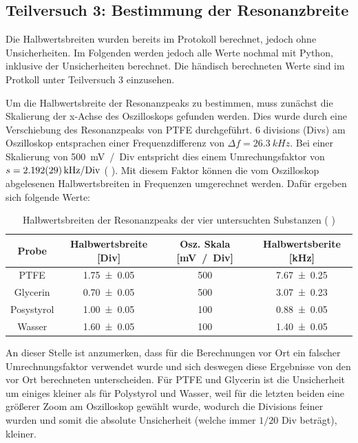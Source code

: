 \documentclass{article}
\newcommand{\coderef}[1]{%
    \text{\footnotesize \colorbox{codebg}{\texttt{#1()}}}%
}
\begin{document}
\newpage

\subsection{Teilversuch 3: Bestimmung der Resonanzbreite}

Die Halbwertsbreiten wurden bereits im Protokoll berechnet, jedoch ohne Unsicherheiten. 
Im Folgenden werden jedoch alle Werte nochmal mit Python, inklusive der Unsicherheiten
berechnet. Die händisch berechneten Werte sind im Protkoll
unter Teilversuch 3 einzusehen.

Um die Halbwertsbreite der Resonanzpeaks zu bestimmen, muss zunächst
die Skalierung der x-Achse des Oszilloskops gefunden werden.
Dies wurde durch eine Verschiebung des Resonanzpeaks von PTFE durchgeführt.
6 divisions (Divs) am Oszilloskop entsprachen einer Frequenzdifferenz
von $\Delta f = \qty{26.3}{kHz}$. Bei einer Skalierung von \qty{500}{mV / Div}
entspricht dies einem Umrechungsfaktor von
$s = \qty{2.192 \pm 0.029}{\kilo\hertz\per Div}$ (\coderef{tv3}).
Mit diesem Faktor können die vom Oszilloskop abgelesenen
Halbwertsbreiten in Frequenzen umgerechnet werden. Dafür ergeben sich folgende Werte:

\begin{table}[H]
    \centering
    \begin{tabular}{c|ccc}
        Probe & Halbwertsbreite [Div] & Osz. Skala [\unit{mV / Div}]
        & Halbwertsberite [\unit{kHz}] \\
        \hline
        PTFE & \num{1.75 \pm 0.05} & \num{500} & \num{7.67 \pm 0.25} \\
        Glycerin & \num{0.70 \pm 0.05} & \num{500} & \num{3.07 \pm 0.23} \\
        Posystyrol & \num{1.00 \pm 0.05} & \num{100} & \num{0.88 \pm 0.05} \\
        Wasser & \num{1.60 \pm 0.05} & \num{100} & \num{1.40 \pm 0.05}
    \end{tabular}
    \caption{Halbwertsbreiten der Resonanzpeaks der vier untersuchten Substanzen
    (\coderef{tv3})}
    \label{table_tv3}
\end{table}

An dieser Stelle ist anzumerken, dass für die Berechnungen vor Ort ein falscher
Umrechnungsfaktor verwendet wurde und sich deswegen diese Ergebnisse von den
vor Ort berechneten unterscheiden.
Für PTFE und Glycerin ist die Unsicherheit um einiges kleiner als für
Polystyrol und Wasser, weil für die letzten beiden eine größerer Zoom am Oszilloskop
gewählt wurde, wodurch die Divisions feiner wurden und somit die absolute Unsicherheit
(welche immer $1 / 20$ Div beträgt), kleiner.
\end{document}

